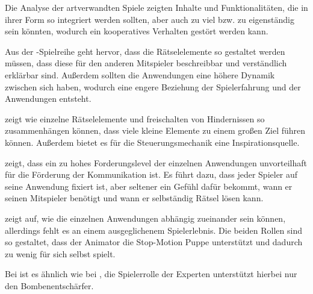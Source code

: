 Die Analyse der artverwandten Spiele zeigten Inhalte und Funktionalitäten, die in ihrer Form so integriert werden sollten, aber auch zu viel bzw. zu eigenständig sein könnten, wodurch ein kooperatives Verhalten gestört werden kann.

Aus der -Spielreihe geht hervor, dass die Rätselelemente so gestaltet werden müssen, dass diese für den anderen Mitspieler beschreibbar und verständlich erklärbar sind. Außerdem sollten die Anwendungen eine höhere Dynamik zwischen sich haben, wodurch eine engere Beziehung der Spielerfahrung und der Anwendungen entsteht. 

 zeigt wie einzelne Rätselelemente und freischalten von Hindernissen so zusammenhängen können, dass viele kleine Elemente zu einem großen Ziel führen können. Außerdem bietet es für die Steuerungsmechanik eine Inspirationsquelle. 

 zeigt, dass ein zu hohes Forderungslevel der einzelnen Anwendungen unvorteilhaft für die Förderung der Kommunikation ist. Es führt dazu, dass jeder Spieler auf seine Anwendung fixiert ist, aber seltener ein Gefühl dafür bekommt, wann er seinen Mitspieler benötigt und wann er selbständig Rätsel lösen kann. 

 zeigt auf, wie die einzelnen Anwendungen abhängig zueinander sein können, allerdings fehlt es an einem ausgeglichenem Spielerlebnis. Die beiden Rollen sind so gestaltet, dass der Animator die Stop-Motion Puppe unterstützt und dadurch zu wenig für sich selbst spielt. 

Bei  ist es ähnlich wie bei , die Spielerrolle der Experten unterstützt hierbei nur den Bombenentschärfer.




